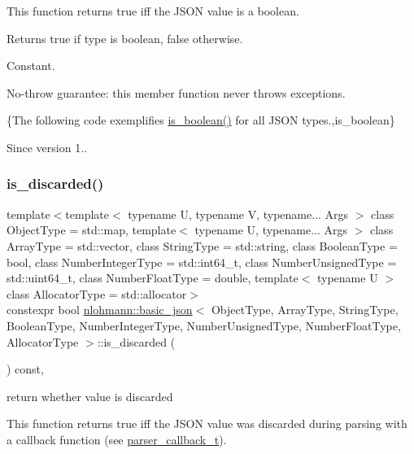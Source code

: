 This function returns true iff the J\+S\+ON value is a boolean.

\begin{DoxyReturn}{Returns}
{\ttfamily true} if type is boolean, {\ttfamily false} otherwise.
\end{DoxyReturn}
Constant.

No-\/throw guarantee\+: this member function never throws exceptions.

\{The following code exemplifies {\ttfamily \hyperlink{classnlohmann_1_1basic__json_adade77415e7f7bf08a9b5150c742714d}{is\+\_\+boolean()}} for all J\+S\+ON types.,is\+\_\+boolean\}

\begin{DoxySince}{Since}
version 1.. 
\end{DoxySince}
\hypertarget{classnlohmann_1_1basic__json_a1002d187e05b5323bda5de124cbe95a8}{}\label{classnlohmann_1_1basic__json_a1002d187e05b5323bda5de124cbe95a8} 
\subsubsection{\texorpdfstring{is\+\_\+discarded()}{is\_discarded()}}
{\footnotesize\ttfamily template$<$template$<$ typename U, typename V, typename... Args $>$ class Object\+Type = std\+::map, template$<$ typename U, typename... Args $>$ class Array\+Type = std\+::vector, class String\+Type  = std\+::string, class Boolean\+Type  = bool, class Number\+Integer\+Type  = std\+::int64\+\_\+t, class Number\+Unsigned\+Type  = std\+::uint64\+\_\+t, class Number\+Float\+Type  = double, template$<$ typename U $>$ class Allocator\+Type = std\+::allocator$>$ \\
constexpr bool \hyperlink{classnlohmann_1_1basic__json}{nlohmann\+::basic\+\_\+json}$<$ Object\+Type, Array\+Type, String\+Type, Boolean\+Type, Number\+Integer\+Type, Number\+Unsigned\+Type, Number\+Float\+Type, Allocator\+Type $>$\+::is\+\_\+discarded (\begin{DoxyParamCaption}{ }\end{DoxyParamCaption}) const\hspace{0.3cm}{\ttfamily [inline]}, {\ttfamily [noexcept]}}



return whether value is discarded 

This function returns true iff the J\+S\+ON value was discarded during parsing with a callback function (see \hyperlink{classnlohmann_1_1basic__json_a9e35475e2027520a78e09f460dbe048a}{parser\+\_\+callback\+\_\+t}).

